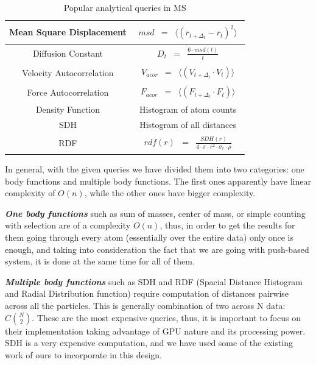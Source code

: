 \documentclass[10pt,journal,final,letterpaper,twocolumn]{IEEEtran}
\begin{document}
\begin{table}[h]
{\begin{minipage}{\columnwidth}
\begin{tabular}{|c| c|}
\hline
Mean Square Displacement& $\begin{array} {lcl} msd & = & \langle (r_{t+\Delta_t}-r_t)^2 \rangle \end{array}$ \\[0.5ex]
\hline
Diffusion Constant & $\begin{array} {lcl} D_t & = & \frac{6 \cdot msd(t)}{t} \end{array}$ \\[0.5ex]
\hline Velocity Autocorrelation & $\begin{array} {lcl} V_{acor} & =&
\langle (V_{t+\Delta_t}\cdot V_t) \rangle \end{array}$ \\[0.5ex]
\hline
Force Autocorrelation & $\begin{array} {lcl} F_{acor} & = & \langle (F_{t+\Delta_t} \cdot F_t) \rangle \end{array}$ \\[0.5ex]
\hline
Density Function & Histogram of atom counts \\[0.5ex]
\hline
SDH & Histogram of all distances \\[0.5ex]
\hline
RDF & $\begin{array} {lcl} rdf(r) & = & \frac{SDH(r)}{4 \cdot \pi \cdot r^2 \cdot \sigma_r \cdot \rho} \end{array}$ \\[0.5ex]
\hline
\end{tabular}
\caption[Table caption text]{Popular analytical queries in MS\cite{mainPaper} }
\label{tb:queries}
\end{minipage} }
\end{table}

In general, with the given queries we have divided them into two categories: one body functions and multiple body functions. The first ones apparently have linear complexity of $O(n)$, while the other ones have bigger complexity. 

\emph{\textbf{One body functions}} such as sum of masses, center of mass, or simple counting with selection  are of a complexity $O(n)$, thus, in order to get the results for them going through every atom (essentially over the entire data) only once is enough, and taking into consideration the fact that we are going with push-based system, it is done at the same time for all of them. 

\emph{\textbf{Multiple body functions}} such as SDH and RDF (Spacial Distance Histogram and Radial Distribution function) require computation of distances pairwise across all the particles. This is generally combination of two across N data: 	$C\binom{N}{2}$. These are the most expensive queries, thus, it is important to focus on their implementation taking advantage of GPU nature and its processing power. SDH is a very expensive computation, and we have used some of the existing work of ours\cite{sdhgpu} to incorporate in this design.
\end{document}
